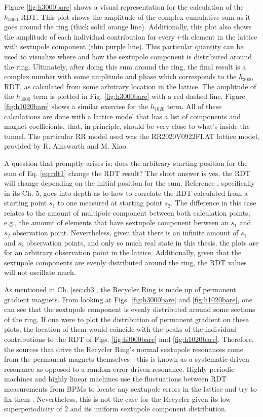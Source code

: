 Figure \ref{fig:h3000bare} shows a visual representation for the calculation of the $h_{3000}$ RDT. This plot shows the amplitude of the complex cumulative sum as it goes around the ring (thick solid orange line). Additionally, this plot also shows the amplitude of each individual contribution for every $i$-th element in the lattice with sextupole component (thin purple line). This particular quantity can be used to visualize where and how the sextupole component is distributed around the ring. Ultimately, after doing this sum around the ring, the final result is a complex number with some amplitude and phase which corresponds to the $h_{3000}$ RDT, as calculated from some arbitrary location in the lattice. The amplitude of the $h_{3000}$ term is plotted in Fig. \ref{fig:h3000bare} with a red dashed line. Figure \ref{fig:h1020bare} shows a similar exercise for the $h_{1020}$ term. All of these calculations are done with a lattice model that has a list of components and magnet coefficients, that, in principle, should be very close to what's inside the tunnel. The particular RR model used was the RR2020V0922FLAT lattice model, provided by R. Ainsworth and M. Xiao.

A question that promptly arises is: does the arbitrary starting position for the sum of Eq. \ref{eq:rdt1} change the RDT result? The short answer is yes, the RDT will change depending on the initial position for the sum. Reference \cite{cernthesis2}, specifically in its Ch. 5, goes into depth as to how to correlate the RDT calculated from a starting point $s_1$ to one measured at starting point $s_2$. The difference in this case relates to the amount of multipole component between both calculation points, e.g., the amount of elements that have sextupole component between an $s_1$ and $s_2$ observation point. Nevertheless, given that there is an infinite amount of $s_1$ and $s_2$ observation points, and only so much real state in this thesis, the plots are for an arbitrary observation point in the lattice. Additionally, given that the sextupole components are evenly distributed around the ring, the RDT values will not oscillate much.

As mentioned in Ch. \ref{sec:ch3}, the Recycler Ring is made up of permanent gradient magnets. From looking at Figs. \ref{fig:h3000bare} and \ref{fig:h1020bare}, one can see that the sextupole component is evenly distributed around some sections of the ring. If one were to plot the distribution of permanent gradient on these plots, the location of them would coincide with the peaks of the individual contributions to the RDT of Figs. \ref{fig:h3000bare} and \ref{fig:h1020bare}. Therefore, the sources that drive the Recycler Ring's normal sextupole resonances come from the permanent magnets themselves---this is known as a systematic-driven resonance as opposed to a random-error-driven resonance. Highly periodic machines and highly linear machines use the fluctuations between RDT measurements from BPMs to locate any sextupole errors in the lattice and try to fix them \cite{cernthesis2}. Nevertheless, this is not the case for the Recycler given its low superperiodicity of 2 and its uniform sextupole component distribution.

